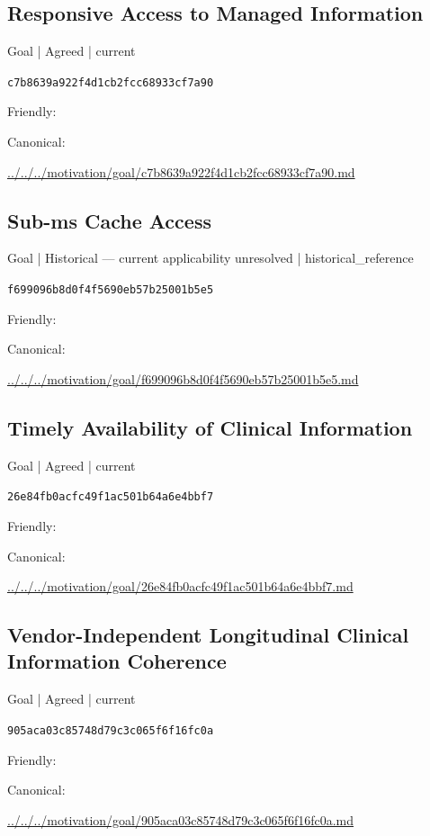 \documentclass[10pt,a4paper]{article}
\begin{document}
\subsection*{Responsive Access to Managed Information}
{\small Goal | Agreed | current}\par
\texttt{c7b8639a922f4d1cb2fcc68933cf7a90}\par
Friendly: \par
Canonical: \par
{\footnotesize\url{../../../motivation/goal/c7b8639a922f4d1cb2fcc68933cf7a90.md}}\par
\subsection*{Sub-ms Cache Access}
{\small Goal | Historical — current applicability unresolved | historical\_reference}\par
\texttt{f699096b8d0f4f5690eb57b25001b5e5}\par
Friendly: \par
Canonical: \par
{\footnotesize\url{../../../motivation/goal/f699096b8d0f4f5690eb57b25001b5e5.md}}\par
\subsection*{Timely Availability of Clinical Information}
{\small Goal | Agreed | current}\par
\texttt{26e84fb0acfc49f1ac501b64a6e4bbf7}\par
Friendly: \par
Canonical: \par
{\footnotesize\url{../../../motivation/goal/26e84fb0acfc49f1ac501b64a6e4bbf7.md}}\par
\subsection*{Vendor-Independent Longitudinal Clinical Information Coherence}
{\small Goal | Agreed | current}\par
\texttt{905aca03c85748d79c3c065f6f16fc0a}\par
Friendly: \par
Canonical: \par
{\footnotesize\url{../../../motivation/goal/905aca03c85748d79c3c065f6f16fc0a.md}}\par
\end{document}
